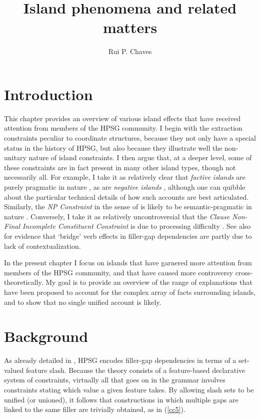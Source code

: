 \documentclass[output=paper
 	        ,biblatex
                ,babelshorthands
                ,newtxmath
                ,draftmode
                ,colorlinks, citecolor=brown
]{langscibook}
\author{Rui P. Chaves\affiliation{University at Buffalo, SUNY}}
\title{Island phenomena and related matters}
\begin{document}
\maketitle
\label{chap-islands}



\section{Introduction} 

 This chapter provides an overview of various island effects that have received attention from members of
 the HPSG community. I begin with the extraction constraints peculiar to coordinate structures, because they not only have a special status in the history of HPSG, but also because they
illustrate well the non-unitary nature of island constraints. I then argue that, at a deeper level, some of these constraints are in fact present in many other island types, though not necessarily all.
For example, I take it as relatively clear that \emph{factive islands}  are purely pragmatic in nature \citep{Oshima:2006:FIP:1761528.1761544}, as are \emph{negative islands} \citep{kroch89,sza,abrusan,foxneg,abrusanspec},
although one can quibble about the particular technical details of how such accounts are best articulated. 
Similarly,  the \emph{NP Constraint} in the sense of \citet{horn72} is likely to be semantic-pragmatic in nature \citep{kuno87,godard92f,dubinsky2009}. Conversely, I take it as relatively uncontroversial that the \emph{Clause Non-Final Incomplete Constituent  Constraint}  is due to processing difficulty \citep{lev91,fodor92}. See also
\citet{kothari} for evidence that `bridge' verb effects in filler-gap dependencies are partly due to lack of contextualization. 

In the present chapter I focus on islands that have garnered more attention from members of the HPSG community, and that have caused more  controversy cross-theoretically. My goal is to provide an overview of the range of explanations that have been proposed to account for the complex array of facts surrounding islands, and to
show that no single unified account is likely.

\section{Background}

As already detailed in , HPSG encodes filler-gap dependencies in terms of a set-valued feature
{\sc slash}. Because the theory consists of a feature-based declarative system of constraints, virtually all that goes on in the grammar involves constraints stating which value a given feature takes. By allowing {\sc slash} sets to be unified (or unioned),  
it follows that constructions in which multiple gaps are linked to the same filler are trivially obtained, 
as in  (\ref{cc5}).
\end{document}
